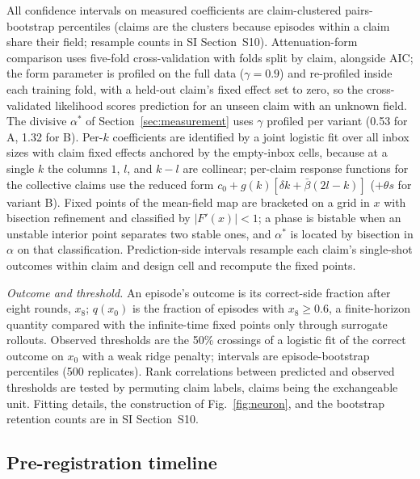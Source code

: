 \documentclass[11pt]{article}
\newcommand{\astar}{\alpha^{*}}
\begin{document}
All confidence intervals on measured coefficients are claim-clustered
pairs-bootstrap percentiles (claims are the clusters because episodes within
a claim share their field; resample counts in SI Section~S10).
Attenuation-form comparison uses five-fold cross-validation with folds split
by claim, alongside AIC; the form parameter is profiled on the full data
($\gamma = 0.9$) and re-profiled inside each training fold, with a held-out
claim's fixed effect set to zero, so the cross-validated likelihood scores
prediction for an unseen claim with an unknown field. The divisive $\astar$
of Section~\ref{sec:measurement} uses $\gamma$ profiled per variant (0.53 for
A, 1.32 for B). Per-$k$ coefficients are identified by a joint logistic fit
over all inbox sizes with claim fixed effects anchored by the empty-inbox
cells, because at a single $k$ the columns $1$, $l$, and $k - l$ are
collinear; per-claim response functions for the collective claims use the
reduced form $c_0 + g(k)[\delta k + \bar\beta(2l - k)]$ ($+\theta s$ for
variant B). Fixed points of the mean-field map are bracketed on a grid in $x$
with bisection refinement and classified by $|F'(x)| < 1$; a phase is
bistable when an unstable interior point separates two stable ones, and
$\astar$ is located by bisection in $\alpha$ on that classification.
Prediction-side intervals resample each claim's single-shot outcomes within
claim and design cell and recompute the fixed points.

\emph{Outcome and threshold.} An episode's outcome is its correct-side
fraction after eight rounds, $x_8$; $q(x_0)$ is the fraction of episodes with
$x_8 \ge 0.6$, a finite-horizon quantity compared with the infinite-time
fixed points only through surrogate rollouts. Observed thresholds are the
50\% crossings of a logistic fit of the correct outcome on $x_0$ with a weak
ridge penalty; intervals are episode-bootstrap percentiles (500 replicates).
Rank correlations between predicted and observed thresholds are tested by
permuting claim labels, claims being the exchangeable unit. Fitting details,
the construction of Fig.~\ref{fig:neuron}, and the bootstrap retention
counts are in SI Section~S10.

\subsection*{Pre-registration timeline}
\end{document}
